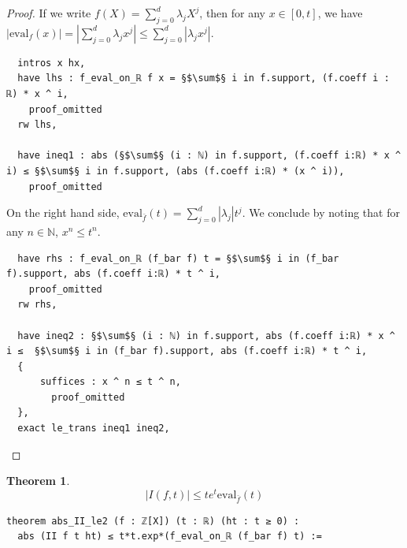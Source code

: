 \documentclass{report}
\theoremstyle{definition}
\newtheorem{theorem}{Theorem}[section]
\begin{document}
\begin{proof}
If we write $f(X)=\sum_{j=0}^d\lambda_j X^j$, then for any $x\in[0,t]$, we have $\left|\mathrm{eval}_f(x)\right|=\left|\sum_{j=0}^d\lambda_j x^j\right|\le \sum_{j=0}^d\left|\lambda_j x^j\right|$.
\begin{verbatim}
  intros x hx,
  have lhs : f_eval_on_ℝ f x = §$\sum$§ i in f.support, (f.coeff i : ℝ) * x ^ i,
    proof_omitted
  rw lhs,
  
  have ineq1 : abs (§$\sum$§ (i : ℕ) in f.support, (f.coeff i:ℝ) * x ^ i) ≤ §$\sum$§ i in f.support, (abs (f.coeff i:ℝ) * (x ^ i)),
    proof_omitted
\end{verbatim}

On the right hand side, $\mathrm{eval}_{\bar f}(t)=\sum_{j=0}^d \left|\lambda_j\right|t^j$. We conclude by noting that for any $n\in\mathbb N$, $x^n\le t^n$.

\begin{verbatim}
  have rhs : f_eval_on_ℝ (f_bar f) t = §$\sum$§ i in (f_bar f).support, abs (f.coeff i:ℝ) * t ^ i,
    proof_omitted
  rw rhs,

  have ineq2 : §$\sum$§ (i : ℕ) in f.support, abs (f.coeff i:ℝ) * x ^ i ≤  §$\sum$§ i in (f_bar f).support, abs (f.coeff i:ℝ) * t ^ i,
  {
      suffices : x ^ n ≤ t ^ n,
        proof_omitted
  },
  exact le_trans ineq1 ineq2,  
\end{verbatim}
\end{proof}

\begin{theorem}\label{lemma:Iupperbound}
$$\left|I(f, t)\right|\le t e^t\mathrm{eval}_{\bar f}(t)$$
\begin{verbatim}
theorem abs_II_le2 (f : ℤ[X]) (t : ℝ) (ht : t ≥ 0) : 
  abs (II f t ht) ≤ t*t.exp*(f_eval_on_ℝ (f_bar f) t) :=
\end{verbatim}
\end{theorem}
\end{document}

